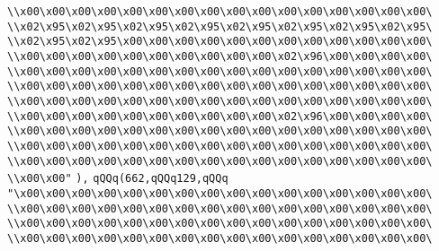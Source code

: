 \verb|\\x00\x00\x00\x00\x00\x00\x00\x00\x00\x00\x00\x00\x00\x00\x00\x00\|\newline
\verb|\\x02\x95\x02\x95\x02\x95\x02\x95\x02\x95\x02\x95\x02\x95\x02\x95\|\newline
\verb|\\x02\x95\x02\x95\x00\x00\x00\x00\x00\x00\x00\x00\x00\x00\x00\x00\|\newline
\verb|\\x00\x00\x00\x00\x00\x00\x00\x00\x00\x00\x02\x96\x00\x00\x00\x00\|\newline
\verb|\\x00\x00\x00\x00\x00\x00\x00\x00\x00\x00\x00\x00\x00\x00\x00\x00\|\newline
\verb|\\x00\x00\x00\x00\x00\x00\x00\x00\x00\x00\x00\x00\x00\x00\x00\x00\|\newline
\verb|\\x00\x00\x00\x00\x00\x00\x00\x00\x00\x00\x00\x00\x00\x00\x00\x00\|\newline
\verb|\\x00\x00\x00\x00\x00\x00\x00\x00\x00\x00\x02\x96\x00\x00\x00\x00\|\newline
\verb|\\x00\x00\x00\x00\x00\x00\x00\x00\x00\x00\x00\x00\x00\x00\x00\x00\|\newline
\verb|\\x00\x00\x00\x00\x00\x00\x00\x00\x00\x00\x00\x00\x00\x00\x00\x00\|\newline
\verb|\\x00\x00\x00\x00\x00\x00\x00\x00\x00\x00\x00\x00\x00\x00\x00\x00\|\newline
\verb|\\x00\x00"|\newline
\verb|),|\newline
\verb|qQQq(662,qQQq129,qQQq|\newline
\verb|"\x00\x00\x00\x00\x00\x00\x00\x00\x00\x00\x00\x00\x00\x00\x00\x00\|\newline
\verb|\\x00\x00\x00\x00\x00\x00\x00\x00\x00\x00\x00\x00\x00\x00\x00\x00\|\newline
\verb|\\x00\x00\x00\x00\x00\x00\x00\x00\x00\x00\x00\x00\x00\x00\x00\x00\|\newline
\verb|\\x00\x00\x00\x00\x00\x00\x00\x00\x00\x00\x00\x00\x00\x00\x00\x00\|\newline
